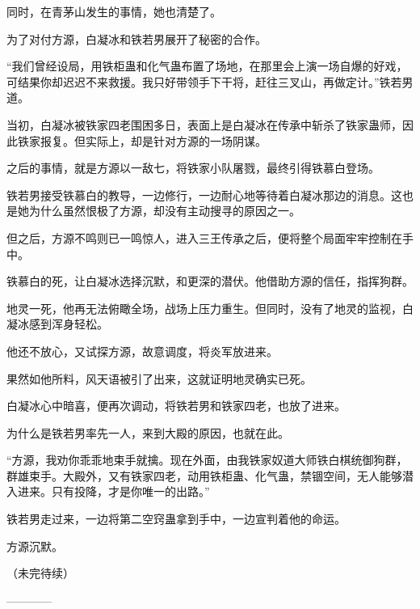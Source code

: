 \begin{this_body}
同时，在青茅山发生的事情，她也清楚了。

为了对付方源，白凝冰和铁若男展开了秘密的合作。

“我们曾经设局，用铁柜蛊和化气蛊布置了场地，在那里会上演一场自爆的好戏，可结果你却迟迟不来救援。我只好带领手下干将，赶往三叉山，再做定计。”铁若男道。

当初，白凝冰被铁家四老围困多日，表面上是白凝冰在传承中斩杀了铁家蛊师，因此铁家报复。但实际上，却是针对方源的一场阴谋。

之后的事情，就是方源以一敌七，将铁家小队屠戮，最终引得铁慕白登场。

铁若男接受铁慕白的教导，一边修行，一边耐心地等待着白凝冰那边的消息。这也是她为什么虽然恨极了方源，却没有主动搜寻的原因之一。

但之后，方源不鸣则已一鸣惊人，进入三王传承之后，便将整个局面牢牢控制在手中。

铁慕白的死，让白凝冰选择沉默，和更深的潜伏。他借助方源的信任，指挥狗群。

地灵一死，他再无法俯瞰全场，战场上压力重生。但同时，没有了地灵的监视，白凝冰感到浑身轻松。

他还不放心，又试探方源，故意调度，将炎军放进来。

果然如他所料，风天语被引了出来，这就证明地灵确实已死。

白凝冰心中暗喜，便再次调动，将铁若男和铁家四老，也放了进来。

为什么是铁若男率先一人，来到大殿的原因，也就在此。

“方源，我劝你乖乖地束手就擒。现在外面，由我铁家奴道大师铁白棋统御狗群，群雄束手。大殿外，又有铁家四老，动用铁柜蛊、化气蛊，禁锢空间，无人能够潜入进来。只有投降，才是你唯一的出路。”

铁若男走过来，一边将第二空窍蛊拿到手中，一边宣判着他的命运。

方源沉默。

（未完待续）

------------

\end{this_body}

